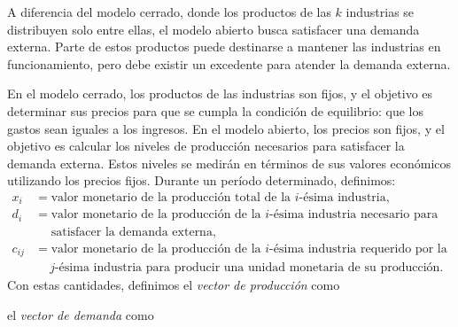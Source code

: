 A diferencia del modelo cerrado, donde los productos de las $k$ industrias se distribuyen solo entre ellas, el modelo abierto busca satisfacer una demanda externa. Parte de estos productos puede destinarse a mantener las industrias en funcionamiento, pero debe existir un excedente para atender la demanda externa.

En el modelo cerrado, los productos de las industrias son fijos, y el objetivo es determinar sus precios para que se cumpla la condición de equilibrio: que los gastos sean iguales a los ingresos. En el modelo abierto, los precios son fijos, y el objetivo es calcular los niveles de producción necesarios para satisfacer la demanda externa. Estos niveles se medirán en términos de sus valores económicos utilizando los precios fijos. Durante un período determinado, definimos:
\begin{align*}
    x_i & = \text{valor monetario de la producción total de la } i\text{-ésima industria}, \\
    d_i & = \text{valor monetario de la producción de la } i \text{-ésima industria necesario para } \\
    & \quad \text{ satisfacer la demanda externa}, \\
    c_{ij} & = \text{valor monetario de la producción de la } i \text{-ésima industria requerido por la } \\
    & \quad~ j \text{-ésima industria para producir una unidad monetaria de su producción}.
\end{align*}
Con estas cantidades, definimos el \emph{vector de producción} como
\begin{matrizn}
\end{matrizn}
el \emph{vector de demanda} como
\begin{matrizn}
\end{matrizn}
\newpage\noindent
